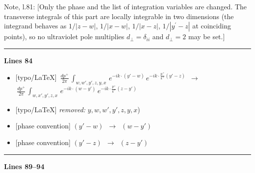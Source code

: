 \documentclass[10pt]{article}
\newenvironment{notebox}{\def\FrameCommand{{\color{notebar}\vrule width 1.5pt}\hspace{6pt}}\MakeFramed{\advance\hsize-\width\FrameRestore}\small}{\endMakeFramed}
\begin{document}
\begin{notebox}\textsf{\small Note, l.81:} [Only the phase and the list of integration variables are changed. The transverse integrals of this part are locally integrable in two dimensions (the integrand behaves as $1/|z-w|$, $1/|x-w|$, $1/|x-z|$, $1/|y^{\prime}-z|$ at coinciding points), so no ultraviolet pole multiplies $d_{\perp}=\delta_{ii}$ and $d_{\perp}=2$ may be set.]\end{notebox}
\noindent\rule{\linewidth}{0.3pt}\par\noindent\textbf{Lines 84} \par
\begin{itemize}[leftmargin=2.2em,itemsep=1pt,topsep=2pt]
\item[\textbf{l.84}] \textsf{\small [typo/LaTeX]} $\displaystyle \, \frac{dp^{+}}{2\pi}\,\int_{w,w',y',z,y,x}\, e^{-ik\cdot (y'-w)}\,e^{-ik\cdot \frac{p^{+}}{k^{+}}(y'-z)}$\ $\longrightarrow$\ $\displaystyle \, \frac{dp^{+}}{2\pi}\,\int_{w,x',y',z,x}\, e^{-ik\cdot (w-y')}\,e^{-ik\cdot \frac{p^{+}}{k^{+}}(z-y')}$
\item[\textbf{l.84}] \textsf{\small [typo/LaTeX]} \emph{removed:} $\displaystyle y,$$\displaystyle w,w',y',z,y,x${\color{gray}\small)}
\item[\textbf{l.84}] \textsf{\small [phase convention]} $\displaystyle (y'-w)$\ $\longrightarrow$\ $\displaystyle (w-y')$
\item[\textbf{l.84}] \textsf{\small [phase convention]} $\displaystyle (y'-z)$\ $\longrightarrow$\ $\displaystyle (z-y')$
\end{itemize}
\noindent\rule{\linewidth}{0.3pt}\par\noindent\textbf{Lines 89--94} \par
\end{document}
